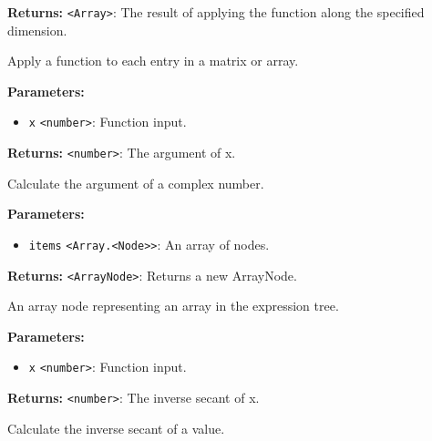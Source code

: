 \documentclass[12pt,a4paper]{article}
\begin{document}
\noindent \textbf{Returns:} \texttt{<Array>}: The result of applying the function along the specified dimension.

\noindent Apply a function to each entry in a matrix or array.

\vspace{5mm}
\noindent {}


\noindent \textbf{Parameters:}
\begin{itemize}
  \item \texttt{x} \texttt{<number>}: Function input.
\end{itemize}

\noindent \textbf{Returns:} \texttt{<number>}: The argument of \textasciigrave{}x\textasciigrave{}.

\noindent Calculate the argument of a complex number.

\vspace{5mm}
\noindent {}


\noindent \textbf{Parameters:}
\begin{itemize}
  \item \texttt{items} \texttt{<Array.<Node>>}: An array of nodes.
\end{itemize}

\noindent \textbf{Returns:} \texttt{<ArrayNode>}: Returns a new ArrayNode.

\noindent An array node representing an array in the expression tree.

\vspace{5mm}
\noindent {}


\noindent \textbf{Parameters:}
\begin{itemize}
  \item \texttt{x} \texttt{<number>}: Function input.
\end{itemize}

\noindent \textbf{Returns:} \texttt{<number>}: The inverse secant of \textasciigrave{}x\textasciigrave{}.

\noindent Calculate the inverse secant of a value.

\vspace{5mm}
\noindent {}
\end{document}
